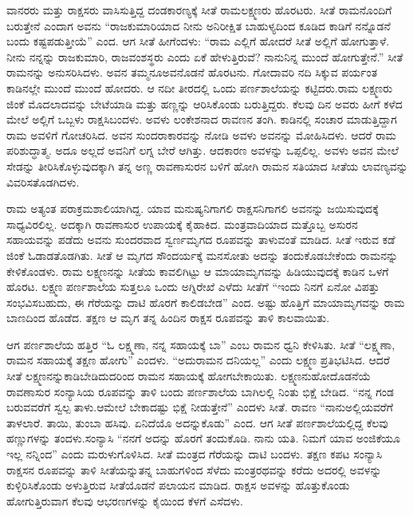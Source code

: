 ವಾನರರು ಮತ್ತು ರಾಕ್ಷಸರು ವಾಸಿಸುತ್ತಿದ್ದ ದಂಡಕಾರಣ್ಯಕ್ಕೆ ಸೀತೆ ರಾಮಲಕ್ಷ್ಮಣರು ಹೊರಟರು. ಸೀತೆ ರಾಮನೊಂದಿಗೆ ಬರುತ್ತೇನೆ ಎಂದಾಗ ಅವನು “ರಾಜಕುಮಾರಿಯಾದ ನೀನು ಅನಿರೀಕ್ಷಿತ ಬಾಹುಳ್ಯದಿಂದ ಕೂಡಿದ ಕಾಡಿಗೆ ನನ್ನೊಡನೆ ಬಂದು ಕಷ್ಟಪಡುತ್ತೀಯೆ” ಎಂದ. ಆಗ ಸೀತೆ ಹೀಗೆಂದಳು: “ರಾಮ ಎಲ್ಲಿಗೆ ಹೋದರೆ ಸೀತೆ ಅಲ್ಲಿಗೆ ಹೋಗುತ್ತಾಳೆ. ನೀನು ನನ್ನನ್ನು ರಾಜಕುಮಾರಿ, ರಾಜವಂಶಸ್ಥರು ಎಂದು ಏಕೆ ಹೇಳುತ್ತಿರುವೆ? ನಾನು\break ನಿನ್ನ ಮುಂದೆ ಹೋಗುತ್ತೇನೆ.” ಸೀತೆ ರಾಮನನ್ನು ಅನುಸರಿಸಿದಳು. ಅವನ ತಮ್ಮನೂ\break ಅವನೊಡನೆ ಹೊರಟನು. ಗೋದಾವರಿ ನದಿ ಸಿಕ್ಕುವ ಪರ್ಯಂತ ಕಾಡಿನಲ್ಲೇ ಮುಂದೆ ಮುಂದೆ ಹೋದರು. ಆ ನದೀ ತೀರದಲ್ಲಿ ಒಂದು ಪರ್ಣಶಾಲೆಯನ್ನು ಕಟ್ಟಿದರು.\break ರಾಮ ಲಕ್ಷ್ಮಣರು ಜಿಂಕೆ ಮೊದಲಾದವನ್ನು ಬೇಟೆಯಾಡಿ ಮತ್ತು ಹಣ್ಣನ್ನು ಆರಿಸಿಕೊಂಡು ಬರುತ್ತಿದ್ದರು. ಕೆಲವು ದಿನ ಅವರು ಹೀಗೆ ಕಳೆದ ಮೇಲೆ ಅಲ್ಲಿಗೆ ಒಬ್ಬಳು ರಾಕ್ಷಸಿ\break ಬಂದಳು. ಅವಳು ಲಂಕೇಶನಾದ ರಾವಣನ ತಂಗಿ. ಕಾಡಿನಲ್ಲಿ ಸಂಚಾರ ಮಾಡುತ್ತಿದ್ದಾಗ ರಾಮ ಅವಳಿಗೆ ಗೋಚರಿಸಿದ. ಅವನ ಸುಂದರಾಕಾರವನ್ನು ನೋಡಿ ಅವಳು ಅವನನ್ನು ಮೋಹಿಸಿದಳು. ಆದರೆ ರಾಮ ಪರಿಶುದ್ಧಾತ್ಮ. ಅದೂ ಅಲ್ಲದೆ ಅವನಿಗೆ ಲಗ್ನ ಬೇರೆ ಆಗಿತ್ತು. ಆದಕಾರಣ ಅವಳನ್ನು ಒಪ್ಪಲಿಲ್ಲ. ಅವಳು ಅವನ ಮೇಲೆ ಸೇಡನ್ನು ತೀರಿಸಿಕೊಳ್ಳುವುದಕ್ಕಾಗಿ ತನ್ನ ಅಣ್ಣ ರಾವಣಾಸುರನ ಬಳಿಗೆ ಹೋಗಿ ರಾಮನ ಸತಿಯಾದ ಸೀತೆಯ ಲಾವಣ್ಯವನ್ನು ವಿವರಿಸತೊಡಗಿದಳು.

ರಾಮ ಅತ್ಯಂತ ಪರಾಕ್ರಮಶಾಲಿಯಾಗಿದ್ದ. ಯಾವ ಮನುಷ್ಯನಿಗಾಗಲಿ ರಾಕ್ಷಸನಿಗಾಗಲಿ ಅವನನ್ನು ಜಯಿಸುವುದಕ್ಕೆ ಸಾಧ್ಯವಿರಲಿಲ್ಲ. ಅದಕ್ಕಾಗಿ ರಾವಣಾಸುರ ಉಪಾಯಕ್ಕೆ ಕೈಹಾಕಿದ. ಮಂತ್ರವಾದಿಯಾದ ಮತ್ತೊಬ್ಬ ಅಸುರನ ಸಹಾಯವನ್ನು ಪಡೆದು ಅವನು ಸುಂದರವಾದ ಸ್ವರ್ಣಮೃಗದ ರೂಪವನ್ನು ತಾಳುವಂತೆ ಮಾಡಿದ. ಸೀತೆ ಇರುವ ಕಡೆ ಜಿಂಕೆ ಓಡಾಡತೊಡಗಿತು. ಸೀತೆ ಆ ಮೃಗದ ಸೌಂದರ್ಯಕ್ಕೆ ಮನಸೋತು ಅದನ್ನು ತಂದುಕೊಡಬೇಕೆಂದು ರಾಮನನ್ನು ಕೇಳಿಕೊಂಡಳು. ರಾಮ ಲಕ್ಷ್ಮಣನನ್ನು ಸೀತೆಯ ಕಾವಲಿಗಿಟ್ಟು ಆ ಮಾಯಾಮೃಗವನ್ನು ಹಿಡಿಯುವುದಕ್ಕೆ ಕಾಡಿನ ಒಳಗೆ ಹೊರಟ. ಲಕ್ಷ್ಮಣ ಪರ್ಣಶಾಲೆಯ ಸುತ್ತಲೂ ಒಂದು ಅಗ್ನಿರೇಖೆ ಎಳೆದು ಸೀತೆಗೆ “ಇಂದು ನಿನಗೆ ಏನೋ ವಿಪತ್ತು ಸಂಭವಿಸಬಹುದು, ಈ ಗೆರೆಯನ್ನು ದಾಟಿ ಹೊರಗೆ ಕಾಲಿಡಬೇಡ” ಎಂದ. ಅಷ್ಟು ಹೊತ್ತಿಗೆ ಮಾಯಾಮೃಗವನ್ನು ರಾಮ ಬಾಣದಿಂದ ಹೊಡೆದ. ತಕ್ಷಣ ಆ ಮೃಗ ತನ್ನ ಹಿಂದಿನ ರಾಕ್ಷಸ ರೂಪವನ್ನು ತಾಳಿ ಕಾಲವಾಯಿತು.

ಆಗ ಪರ್ಣಶಾಲೆಯ ಹತ್ತಿರ “ಓ ಲಕ್ಷ್ಮಣಾ, ನನ್ನ ಸಹಾಯಕ್ಕೆ ಬಾ” ಎಂಬ ರಾಮನ ಧ್ವನಿ ಕೇಳಿಸಿತು. ಸೀತೆ “ಲಕ್ಷ್ಮಣಾ, ರಾಮನ ಸಹಾಯಕ್ಕೆ ತಕ್ಷಣ ಹೋಗು” ಎಂದಳು. “ಅದು\break ರಾಮನ ದನಿಯಲ್ಲ” ಎಂದು ಲಕ್ಷ್ಮಣ ಪ್ರತಿಭಟಿಸಿದ. ಆದರೆ ಸೀತೆ ಲಕ್ಷ್ಮಣನನ್ನು\break ಕಾಡಿಬೇಡಿದುದರಿಂದ ರಾಮನ ಸಹಾಯಕ್ಕೆ ಹೋಗಬೇಕಾಯಿತು. ಲಕ್ಷ್ಮಣನು\break ಹೋದೊಡನೆಯೆ ರಾವಣಾಸುರ ಸಂನ್ಯಾಸಿಯ ರೂಪವನ್ನು ತಾಳಿ ಬಂದು ಪರ್ಣ\break ಶಾಲೆಯ ಬಾಗಿಲಲ್ಲಿ ನಿಂತು ಭಿಕ್ಷೆ ಬೇಡಿದ. “ನನ್ನ ಗಂಡ ಬರುವವರೆಗೆ ಸ್ವಲ್ಪ ತಾಳು.\break ಆಮೇಲೆ ಬೇಕಾದಷ್ಟು ಭಿಕ್ಷೆ ನೀಡುತ್ತೇನೆ” ಎಂದಳು ಸೀತೆ. ರಾವಣ “ನಾನು\break ಅಲ್ಲಿಯವರೆಗೆ ತಾಳಲಾರೆ. ತಾಯಿ, ತುಂಬಾ ಹಸಿವು. ಏನಿದೆಯೊ ಅದನ್ನು\break ಕೊಡು” ಎಂದ. ಆಗ ಸೀತೆ ಪರ್ಣಶಾಲೆಯಲ್ಲಿದ್ದ ಕೆಲವು ಹಣ್ಣುಗಳನ್ನು ತಂದಳು.\break ಸಂನ್ಯಾಸಿ “ನನಗೆ ಅದನ್ನು ಹೊರಗೆ ತಂದುಕೊಡಿ. ನಾನು ಯತಿ. ನಿಮಗೆ ಯಾವ ಅಂಜಿಕೆಯೂ ಇಲ್ಲ ನನ್ನಿಂದ” ಎಂದು ಮರುಳುಗೊಳಿಸಿದ. ಸೀತೆ ಮಂತ್ರದ ಗೆರೆಯನ್ನು ದಾಟಿ ಬಂದಳು. ತಕ್ಷಣ ಕಪಟ ಸಂನ್ಯಾಸಿ ರಾಕ್ಷಸನ ರೂಪವನ್ನು ತಾಳಿ ಸೀತೆಯನ್ನು\break ತನ್ನ ಬಾಹುಗಳಿಂದ ಸೆಳೆದು ಮಂತ್ರರಥವನ್ನು ಕರೆದು ಅದರಲ್ಲಿ ಅವಳನ್ನು ಕುಳ್ಳಿರಿಸಿ\break ಕೊಂಡು ಅಳುತ್ತಿರುವ ಸೀತೆಯೊಡನೆ ಪಲಾಯನ ಮಾಡಿದ. ರಾಕ್ಷಸ ಅವಳನ್ನು ಹೊತ್ತುಕೊಂಡು ಹೋಗುತ್ತಿರುವಾಗ ಕೆಲವು ಆಭರಣಗಳನ್ನು ಕೈಯಿಂದ ಕೆಳಗೆ ಎಸೆದಳು.

